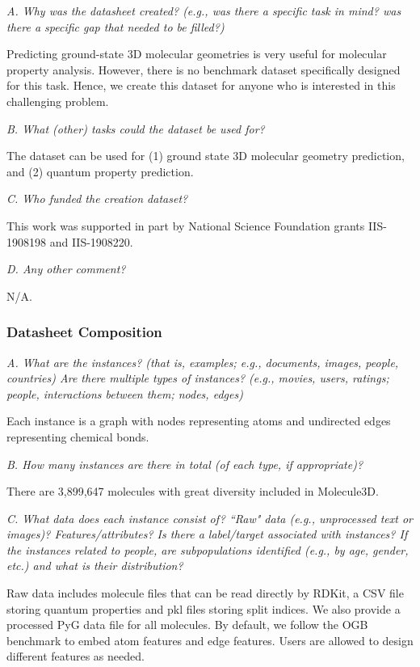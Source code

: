 \documentclass{article}
\begin{document}
\textit{A. Why was the datasheet created? (e.g., was there a specific task in mind? was there a specific gap that needed to be filled?)}

Predicting ground-state 3D molecular geometries is very useful for molecular property analysis. However, there is no benchmark dataset specifically designed for this task. Hence, we create this dataset for anyone who is interested in this challenging problem.

\textit{B. What (other) tasks could the dataset be used for?}

The dataset can be used for (1) ground state 3D molecular geometry prediction, and (2) quantum property prediction.

\textit{C. Who funded the creation dataset?}

This work was supported in part by National Science Foundation grants IIS-1908198 and IIS-1908220.

\textit{D. Any other comment?}

N/A.

\subsubsection{Datasheet Composition}
\textit{A. What are the instances? (that is, examples; e.g., documents, images, people, countries) Are there multiple types of instances? (e.g., movies, users, ratings; people, interactions between them; nodes, edges)}

Each instance is a graph with nodes representing atoms and undirected edges representing chemical bonds. 

\textit{B. How many instances are there in total (of each type, if appropriate)?}

There are 3,899,647 molecules with great diversity included in Molecule3D.

\textit{C. What data does each instance consist of? ``Raw" data (e.g., unprocessed text or images)? Features/attributes? Is there a label/target associated with instances? If the instances related to people, are subpopulations identified (e.g., by age, gender, etc.) and what is their distribution?}

Raw data includes molecule files that can be read directly by RDKit, a CSV file storing quantum properties and pkl files storing split indices. We also provide a processed PyG data file for all molecules. By default, we follow the OGB benchmark to embed atom features and edge features. Users are allowed to design different features as needed. 
\end{document}
